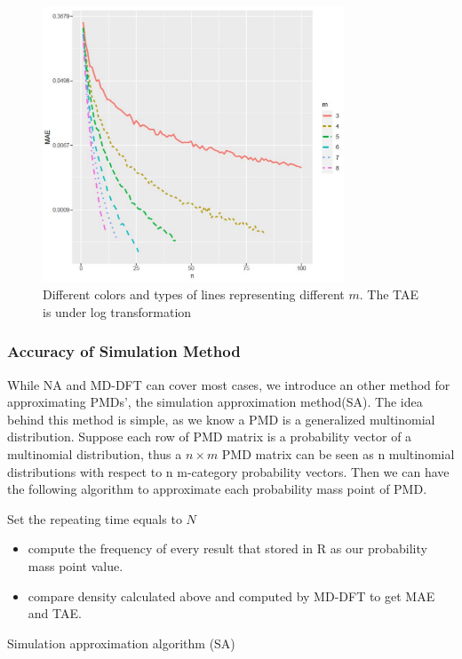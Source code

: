 \documentclass[12pt]{article}
\begin{document}
\begin{figure}%
    \centering
    \includegraphics[width=0.8\textwidth]{normal_accuracy.pdf}
    \caption{Different colors and types of lines representing different $m$. The TAE is under log transformation}
\end{figure}


\subsubsection{Accuracy of Simulation Method}
While NA and MD-DFT can cover most cases, we introduce an other method for approximating PMDs', the simulation approximation method(SA). The idea behind this method is simple, as we know a PMD is a generalized multinomial distribution. Suppose each row of PMD matrix is a probability vector of a multinomial distribution, thus a $n\times m$ PMD matrix can be seen as n multinomial distributions with respect to n m-category probability vectors. Then we can have the following algorithm to approximate each probability mass point of PMD.

\begin{algorithm}%
\SetAlgoLined
{}
 Set the repeating time equals to $N$\;
 \begin{itemize}
     \item compute the frequency of every result that stored in R as our probability mass point value.\\
     \item compare density calculated above and computed by MD-DFT to get MAE and TAE.
 \end{itemize}
 \caption{Simulation approximation algorithm (SA)}
\end{algorithm}
\end{document}
